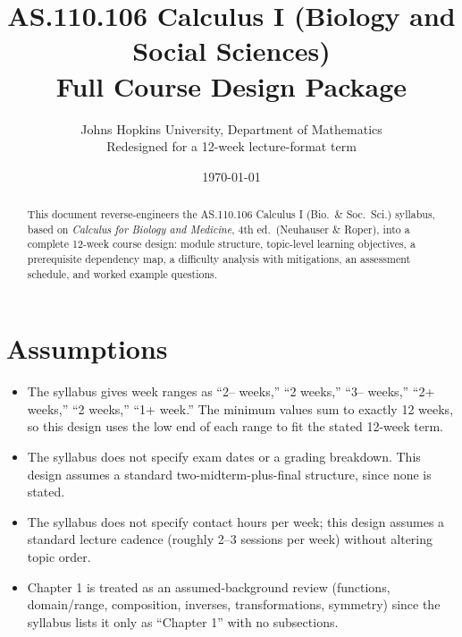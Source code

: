 \documentclass[11pt]{article}
\title{AS.110.106 Calculus I (Biology and Social Sciences) \\ \large Full Course Design Package}
\author{Johns Hopkins University, Department of Mathematics \\ \small Redesigned for a 12-week lecture-format term}
\date{\today}
\begin{document}
\maketitle

\begin{abstract}
\noindent This document reverse-engineers the AS.110.106 Calculus I (Bio.\ \& Soc.\ Sci.) syllabus, based on \emph{Calculus for Biology and Medicine}, 4th ed.\ (Neuhauser \& Roper), into a complete 12-week course design: module structure, topic-level learning objectives, a prerequisite dependency map, a difficulty analysis with mitigations, an assessment schedule, and worked example questions.
\end{abstract}

\section*{Assumptions}
\begin{itemize}
\item The syllabus gives week ranges as ``2-- weeks,'' ``2 weeks,'' ``3-- weeks,'' ``2+ weeks,'' ``2 weeks,'' ``1+ week.'' The minimum values sum to exactly 12 weeks, so this design uses the low end of each range to fit the stated 12-week term.
\item The syllabus does not specify exam dates or a grading breakdown. This design assumes a standard two-midterm-plus-final structure, since none is stated.
\item The syllabus does not specify contact hours per week; this design assumes a standard lecture cadence (roughly 2--3 sessions per week) without altering topic order.
\item Chapter 1 is treated as an assumed-background review (functions, domain/range, composition, inverses, transformations, symmetry) since the syllabus lists it only as ``Chapter 1'' with no subsections.
\end{itemize}

\tableofcontents

\end{document}
